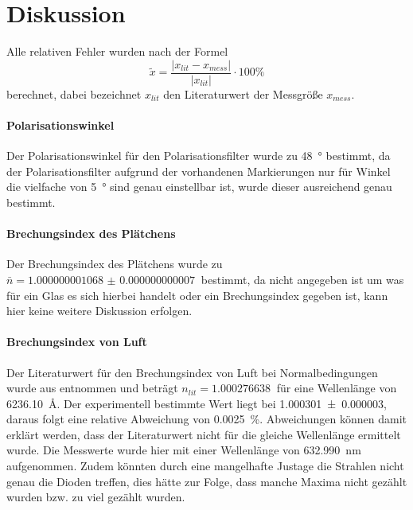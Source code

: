\section{Diskussion}
\label{sec:Diskussion}
Alle relativen Fehler wurden nach der Formel
\begin{equation*}
  \tilde{x} = \frac{ \lvert x_{lit} - x_{mess} \rvert}{\lvert x_{lit} \rvert}
  \cdot 100 \%
\end{equation*}
berechnet, dabei bezeichnet $x_{lit}$ den Literaturwert der Messgröße $x_{mess}$. 
\paragraph{Polarisationswinkel}
Der Polarisationswinkel für den Polarisationsfilter wurde zu \SI{48}{\degree} bestimmt, da der 
Polarisationsfilter aufgrund der vorhandenen Markierungen nur für Winkel 
die vielfache von \SI{5}{\degree} sind genau einstellbar ist, wurde 
dieser ausreichend genau bestimmt.
\paragraph{Brechungsindex des Plätchens} 
Der Brechungsindex des Plätchens wurde zu $\bar{n} = \SI{1.000000001068(7)}{}$ bestimmt, da 
nicht angegeben ist um was für ein Glas es sich hierbei handelt oder ein Brechungsindex gegeben ist, 
kann hier keine weitere Diskussion erfolgen. 
\paragraph{Brechungsindex von Luft} 
Der Literaturwert für den Brechungsindex von Luft bei Normalbedingungen wurde aus 
\cite{brechlit} entnommen und beträgt $n_{lit} = \SI{1.000276638}{}$ für eine Wellenlänge von 
\SI{6236.10}{\angstrom}. Der experimentell bestimmte Wert liegt bei \SI{1.000301(3)}{}, 
daraus folgt eine relative Abweichung von \SI{0.0025}{\percent}. Abweichungen können damit erklärt werden, dass 
der Literaturwert nicht für die gleiche Wellenlänge ermittelt wurde. Die Messwerte wurde hier mit einer 
Wellenlänge von \SI{632.990}{\nano\meter} aufgenommen. Zudem könnten durch eine mangelhafte Justage die 
Strahlen nicht genau die Dioden treffen, dies hätte zur Folge, dass manche Maxima nicht gezählt wurden bzw. 
zu viel gezählt wurden.  
